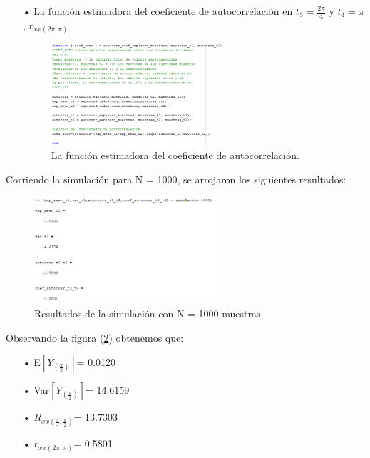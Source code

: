 \begin{enumerate}
\item[•] La función estimadora del coeficiente de autocorrelación en $t_3 = \frac{2\pi}{4}$ y $t_4 = \pi$, $r_{xx(2\pi,\pi)}$
\begin{figure}[H]
\centering
	\includegraphics[width=0.6\textwidth, trim = {0 0 0 0},clip]{./ImagenesEjercicio1/coefauto.png}
	\caption{La función estimadora del coeficiente de autocorrelación.}
	\label{fig:coefauto}
\end{figure}
\end{enumerate}

Corriendo la simulación para N = 1000, se arrojaron los siguientes resultados:
\begin{figure}[H]
\centering
	\includegraphics[width=0.6\textwidth, trim = {0 0 0 0},clip]{./ImagenesEjercicio1/result.png}
	\caption{Resultados de la simulación con N = 1000 muestras}
	\label{fig:result}
\end{figure}

Observando la figura (\ref{fig:result}) obtenemos que:
\begin{enumerate}
	\item[•]E$\left[ Y_{(\frac{\pi}{2})}\right]$= 0.0120 
	\item[•]Var$\left[Y_{(\frac{\pi}{2})}\right]$= 14.6159
	\item[•]$R_{xx(\frac{\pi}{4},\frac{\pi}{2})}$= 13.7303
	\item[•]$r_{xx(2\pi,\pi)}$= 0.5801
\end{enumerate}

